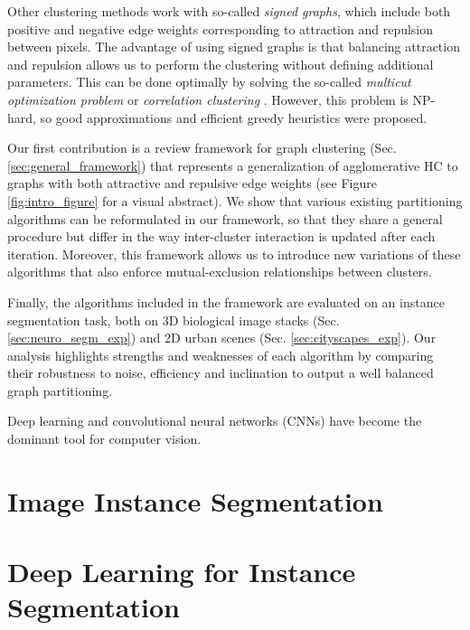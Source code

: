 Other clustering methods work with so-called \emph{signed graphs}, which include both positive and negative edge weights corresponding to attraction and repulsion between pixels. The advantage of using signed graphs is that balancing attraction and repulsion allows us to perform the clustering without defining additional parameters. This can be done optimally by solving the so-called \emph{multicut optimization problem} or \emph{correlation clustering} \cite{kappes2011globally,chopra1991multiway}. However, this problem is NP-hard, so good approximations \cite{yarkony2012fast,pape2017solving} and efficient greedy heuristics \cite{levinkov2017comparative,wolf2018mutex} were proposed.

Our first contribution is a review framework for graph clustering (Sec. \ref{sec:general_framework}) that represents a generalization of agglomerative HC to graphs with both attractive and repulsive edge weights (see Figure \ref{fig:intro_figure} for a visual abstract). 
We show that various existing partitioning algorithms \cite{levinkov2017comparative,wolf2018mutex,kardoostsolving,lance1967general} can be reformulated in our framework, so that they share a general procedure but differ in the way inter-cluster interaction is updated after each iteration. Moreover, this framework allows us to introduce new variations of these algorithms that also enforce mutual-exclusion relationships between clusters.  

Finally, the algorithms included in the framework are evaluated on an instance segmentation task, both on 3D biological image stacks (Sec. \ref{sec:neuro_segm_exp}) and 2D urban scenes (Sec. \ref{sec:cityscapes_exp}). Our analysis highlights strengths and weaknesses of each algorithm by comparing their robustness to noise, efficiency and inclination to output a well balanced graph partitioning.





Deep learning and convolutional neural networks (CNNs) have become the dominant tool for computer vision.

\section{Image Instance Segmentation}

\section{Deep Learning for Instance Segmentation}

